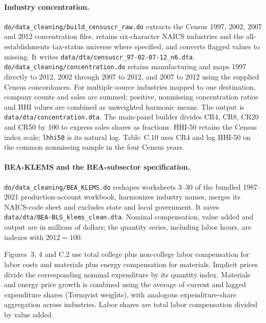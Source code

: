 \documentclass[11pt]{article}
\newcommand{\pkgfile}[1]{\nolinkurl{#1}}
\begin{document}
\paragraph{Industry concentration.}
\pkgfile{do/data_cleaning/build_censuscr_raw.do} extracts the Census
1997, 2002, 2007 and 2012 concentration files, retains six-character NAICS
industries and the all-establishments tax-status universe where specified,
and converts flagged values to missing. It writes
\pkgfile{data/dta/censuscr_97-02-07-12_n6.dta}.
\pkgfile{do/data_cleaning/concentration.do} retains manufacturing and
maps 1997 directly to 2012, 2002 through 2007 to 2012, and 2007 to 2012
using the supplied Census concordances. For multiple source industries
mapped to one destination, company counts and sales are summed; positive,
nonmissing concentration ratios and HHI values are combined as unweighted
harmonic means. The output is \pkgfile{data/dta/concentration.dta}.
The main-panel builder divides CR4, CR8, CR20 and CR50 by 100 to express
sales shares as fractions. HHI-50 retains the Census index scale;
\pkgfile{lhhi50} is its natural log. Table~C.10 uses CR4 and log HHI-50
on the common nonmissing sample in the four Census years.

\paragraph{BEA-KLEMS and the BEA-subsector specification.}
\pkgfile{do/data_cleaning/BEA_KLEMS.do} reshapes worksheets 3--30 of the
bundled 1987--2021 production-account workbook, harmonizes industry names,
merges its NAICS-code sheet and excludes state and local government. It
saves \pkgfile{data/dta/BEA-BLS_klems_clean.dta}. Nominal compensation,
value added and output are in millions of dollars; the quantity series,
including labor hours, are indexes with 2012$=100$.

Figures~3, 4 and C.2 use total college plus non-college labor compensation
for labor costs and materials plus energy compensation for materials.
Implicit prices divide the corresponding nominal expenditure by its
quantity index. Materials and energy price growth is combined using the
average of current and lagged expenditure shares (Tornqvist weights), with
analogous expenditure-share aggregation across industries. Labor shares
are total labor compensation divided by value added.
\end{document}
